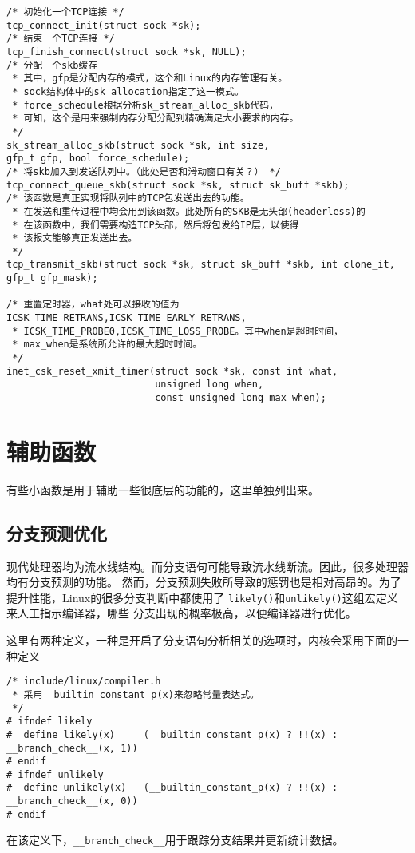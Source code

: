 \begin{verbatim}
/* 初始化一个TCP连接 */
tcp_connect_init(struct sock *sk);
/* 结束一个TCP连接 */
tcp_finish_connect(struct sock *sk, NULL);
/* 分配一个skb缓存
 * 其中，gfp是分配内存的模式，这个和Linux的内存管理有关。
 * sock结构体中的sk_allocation指定了这一模式。
 * force_schedule根据分析sk_stream_alloc_skb代码，
 * 可知，这个是用来强制内存分配分配到精确满足大小要求的内存。
 */
sk_stream_alloc_skb(struct sock *sk, int size,
gfp_t gfp, bool force_schedule);
/* 将skb加入到发送队列中。（此处是否和滑动窗口有关？） */ 
tcp_connect_queue_skb(struct sock *sk, struct sk_buff *skb);
/* 该函数是真正实现将队列中的TCP包发送出去的功能。
 * 在发送和重传过程中均会用到该函数。此处所有的SKB是无头部(headerless)的
 * 在该函数中，我们需要构造TCP头部，然后将包发给IP层，以使得
 * 该报文能够真正发送出去。
 */
tcp_transmit_skb(struct sock *sk, struct sk_buff *skb, int clone_it,
gfp_t gfp_mask);

/* 重置定时器，what处可以接收的值为ICSK_TIME_RETRANS,ICSK_TIME_EARLY_RETRANS,
 * ICSK_TIME_PROBE0,ICSK_TIME_LOSS_PROBE。其中when是超时时间，
 * max_when是系统所允许的最大超时时间。
 */
inet_csk_reset_xmit_timer(struct sock *sk, const int what,
                          unsigned long when,
                          const unsigned long max_when);
\end{verbatim}

\section{辅助函数}
有些小函数是用于辅助一些很底层的功能的，这里单独列出来。

\subsection{分支预测优化}
现代处理器均为流水线结构。而分支语句可能导致流水线断流。因此，很多处理器均有分支预测的功能。
然而，分支预测失败所导致的惩罚也是相对高昂的。为了提升性能，Linux的很多分支判断中都使用了
\texttt{likely()}和\texttt{unlikely()}这组宏定义来人工指示编译器，哪些
分支出现的概率极高，以便编译器进行优化。

这里有两种定义，一种是开启了分支语句分析相关的选项时，内核会采用下面的一种定义
\begin{verbatim}
/* include/linux/compiler.h
 * 采用__builtin_constant_p(x)来忽略常量表达式。
 */
# ifndef likely
#  define likely(x)     (__builtin_constant_p(x) ? !!(x) : __branch_check__(x, 1))
# endif
# ifndef unlikely
#  define unlikely(x)   (__builtin_constant_p(x) ? !!(x) : __branch_check__(x, 0))
# endif
\end{verbatim}
在该定义下，\texttt{__branch_check__}用于跟踪分支结果并更新统计数据。

